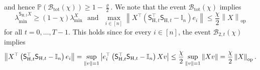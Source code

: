 \documentclass[11pt]{article}
\theoremstyle{definition}
\theoremstyle{plain}
\providecommand{\brI}{\mathbb{I}}
\newcommand{\abs}[1]{\left| #1 \right|}
\newcommand{\Norm}[1]{\left\| #1 \right\|}
\providecommand{\norm}[1]{\Norm{#1}}
\begin{document}
and hence $\mathbb P(\mathcal{B}_{\mathrm{tot}}(\chi))\ge 1-\frac{\varrho}{2}$. We note that the event $\mathcal{B}_{\mathrm{tot}}(\chi)$ implies 
\begin{equation}
    \lambda^{\mathsf{S}_{\mathrm{H},t}X}_{\min}
    \ge (1-\chi)\lambda^{X}_{\min} \ \ \ \mathrm{and} \ \ \ \max_{i\in[n]}
    \norm{X^{\top}\left(\mathsf{S}^{\top}_{\mathrm{H},t}\mathsf{S}_{\mathrm{H},t}-\brI_n\right)e_i}
    \le \frac{\chi}{2}\norm{X}_{\mathrm{op}}
\end{equation}
for all $t=0,\ldots,T-1$. This holds since for every $i\in[n]$, the event $\mathcal{B}_{2,t}(\chi)$ implies
\begin{equation}
    \norm{X^{\top}\left(\mathsf{S}^{\top}_{\mathrm{H},t}\mathsf{S}_{\mathrm{H},t}-\brI_n\right)e_i}
    = \sup_{\norm{v}=1}
    \abs{e_i^\top\left(\mathsf{S}^{\top}_{\mathrm{H},t}\mathsf{S}_{\mathrm{H},t}-\brI_n\right)Xv}\notag \leq \frac{\chi}{2}\sup_{\norm{v}=1}\norm{Xv}
     = \frac{\chi}{2}\norm{X}_{\mathrm{op}}.
\end{equation}
\end{document}
